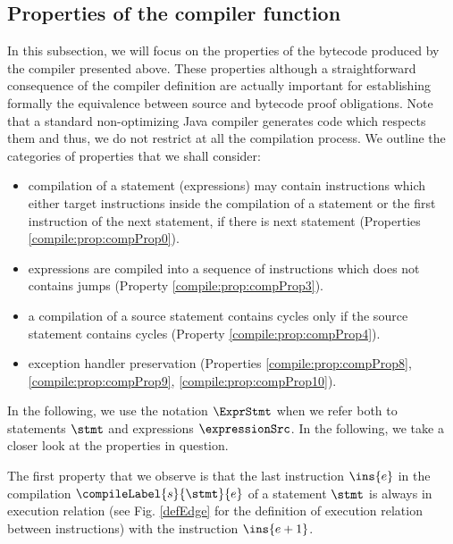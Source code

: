 \subsection{Properties of the compiler function}\label{compile:prop}
In this subsection, we will focus on the properties of the  bytecode produced by the compiler presented above.
These properties although a straightforward consequence of the compiler definition
 are actually important for establishing formally the equivalence between source and bytecode 
proof obligations. Note that a standard non-optimizing Java compiler generates code which respects them and thus, we
do not restrict at all the compilation process.  We outline the categories of properties that we shall consider:
\begin{itemize}
     
     \item compilation of a statement (expressions) may contain instructions which either target instructions inside the compilation of a statement or  the 
           first instruction of the next statement, if there is next statement (Properties \ref{compile:prop:compProp0}).
     
     \item expressions are compiled into a sequence of instructions which does not contains jumps (Property \ref{compile:prop:compProp3}).
     

     \item a compilation of a source statement contains cycles only if the source statement contains cycles (Property \ref{compile:prop:compProp4}).
     
     \item exception handler preservation (Properties \ref{compile:prop:compProp8}, \ref{compile:prop:compProp9},  \ref{compile:prop:compProp10}).
     
\end{itemize}




In the following, we use the notation $\ExprStmt$ when we refer both to statements $\stmt$ and expressions $\expressionSrc$.
In the following, we take a closer look at the properties in question.
 
 The first property that we observe is that the last instruction $\ins{e}$ in the compilation
 $\compileLabel{s}{\stmt}{e}$  of a statement $\stmt$ is always in execution relation
 (see Fig. \ref{defEdge} for the definition of execution relation between instructions) with the
 instruction $\ins{e + 1}$.

